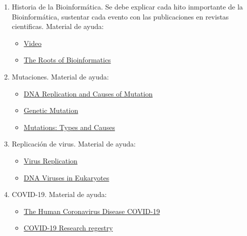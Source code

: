\documentclass{article}
\begin{document}
	\begin{enumerate}
		\item Historia de la Bioinformática. Se debe explicar cada hito inmportante de la Bioinformática, sustentar cada evento con las publicaciones en revistas cientificas. Material de ayuda:
			\begin{itemize}
				\item \href{https://www.coursera.org/learn/bioinformatics-pku/lecture/0i4EF/history-of-bioinformatics}{Video}
				\item \href{https://journals.plos.org/ploscompbiol/article?id=10.1371/journal.pcbi.1000809}{The Roots of Bioinformatics}
			\end{itemize}
		\item Mutaciones. Material de ayuda:
			\begin{itemize}
				\item \href{https://www.nature.com/scitable/topicpage/dna-replication-and-causes-of-mutation-409/}{DNA Replication and Causes of Mutation}
				\item \href{https://www.nature.com/scitable/topicpage/genetic-mutation-441/}{Genetic Mutation}
				\item \href{https://www.ncbi.nlm.nih.gov/books/NBK21578/}{Mutations: Types and Causes}
			\end{itemize}
		
		\item Replicación de virus. Material de ayuda:
		\begin{itemize}
			\item \href{https://reader.elsevier.com/reader/sd/pii/B9780123751560000047?token=9B13E6DC096F4D4A969692D3BE8C9F7F7A9EB515D7CEC08023BB74B04F1BDD0C115766A9665D276C5990CAA8124564E6}{Virus Replication}
			\item \href{https://courses.lumenlearning.com/boundless-microbiology/chapter/dna-viruses-in-eukaryotes/}{DNA Viruses in Eukaryotes}
			
		\end{itemize}
	
		\item COVID-19. Material de ayuda:
		\begin{itemize}
			\item \href{https://drive.google.com/file/d/19nQoOZv8gpxrDPQtlZHTMKygRZD2f15s/view?usp=sharing}{The Human Coronavirus Disease COVID-19}
			\item \href{https://www.asm.org/COVID/COVID-19-Research-Registry/Basic-Virology}{COVID-19 Research regestry}
			
		\end{itemize}
		
	\end{enumerate}
	
	
	
\end{document}

